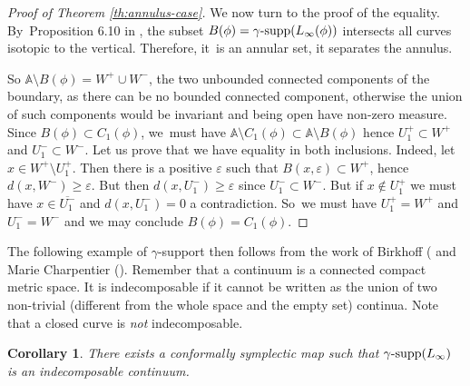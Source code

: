\documentclass[JEP,XML,SOM,Unicode,NoFloatCountersInSection,published]{cedram}
\newtheorem{cor}[thm]{Corollary}
\theoremstyle{definition}
\DeclareMathOperator{\gammasupp}{\gamma\textup{-supp}}
\begin{document}
\begin{proof}[Proof of Theorem \ref{th:annulus-case}]
We now turn to the proof of the equality. By~Proposition 6.10 in \cite{Viterbo-gammas}, the subset $B(\phi)=\gammasupp(L_{\infty}(\phi))$ intersects all curves isotopic to the vertical. Therefore, it~is an annular set, \ie it separates the annulus.

So $\mathbb A \setminus B(\phi) = W^{+}\cup W^{-}$, the two unbounded connected components of the boundary, as there can be no bounded connected component, otherwise the union of such components would be invariant and being open have non-zero measure. Since $B(\phi)\subset C_{1}(\phi)$, we~must have
$\mathbb A \setminus C_{1}(\phi) \subset \mathbb A \setminus B(\phi) $ hence $U_{1}^{+} \subset W^{+}$ and $U_{1}^{-} \subset W^{-}$. Let us prove that we have equality in both inclusions. Indeed, let $x\in W^{+} \setminus U_{1}^{+}$. Then there is a positive $ \varepsilon $ such that $B(x, \varepsilon)\subset W^{+}$, hence $d(x,W^{-}) \geq \varepsilon $. But then $d(x,U_{1}^{-}) \geq \varepsilon $ since $U_{1}^{-} \subset W^{-}$. But if $x\notin U_{1}^{+}$ we must have
$x\in \overline{U_{1}^{-}}$ and $d(x,U_{1}^{-})=0$ a contradiction. So~we must have $U_{1}^{+} = W^{+}$ and $U_{1}^{-} = W^{-}$ and we may conclude $B(\phi)=C_{1}(\phi)$.
\end{proof}

The following example of $\gamma$\nobreakdash-support then follows from the work of Birkhoff (\cite{Birkhoff-attractor} and Marie Charpentier (\cite{Charpentier-1}). Remember that a continuum is a connected compact metric space. It is indecomposable if it cannot be written as the union of two
non-trivial (\ie different from the whole space and the empty set) continua. Note that a closed curve is \emph{not} indecomposable.

\begin{cor} \label{Cor-C7}
There exists a conformally symplectic map such that $\gammasupp(L_{\infty})$ is an indecomposable continuum.
\end{cor}
\end{document}
